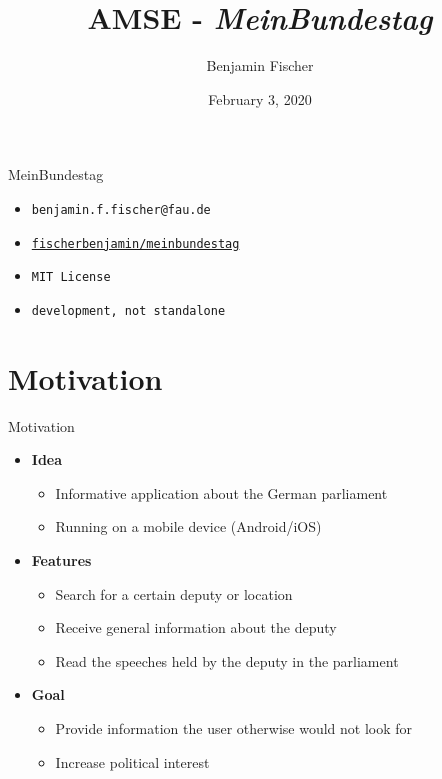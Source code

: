 \documentclass{beamer}
\title{AMSE - \textit{MeinBundestag}}
\date{February 3, 2020}
\author{Benjamin Fischer}
\institute{\faInstitution{}\quad{}Friedrich-Alexander Universität Erlangen-Nürnberg}
\begin{document}
  \maketitle

  \begin{frame}[plain]{MeinBundestag}
    \begin{itemize}
      \item[\faEnvelope]\quad
      \texttt{benjamin.f.fischer@fau.de}
      \item[\faGithub]\quad
      \href{https://github.com/fischerbenjamin/meinbundestag}{\texttt{fischerbenjamin/meinbundestag}}
      \item[\faCopyright]\quad
      \texttt{MIT License}
      \item[\faCogs]\quad
      \texttt{development, not standalone}
    \end{itemize} 
  \end{frame}

  \section{Motivation}
  \begin{frame}[plain]{Motivation}
    \begin{itemize}
      \item[\faInfoCircle]\quad
      \textbf{Idea}
      \begin{itemize}
        \item Informative application about the German parliament
        \item Running on a mobile device (Android/iOS)
      \end{itemize}
      \item[\faBars]\quad
      \textbf{Features}
      \begin{itemize}
        \item Search for a certain deputy or location
        \item Receive general information about the deputy
        \item Read the speeches held by the deputy in the parliament
      \end{itemize}
      \item[\faHeart]\quad
      \textbf{Goal}
      \begin{itemize}
        \item Provide information the user otherwise would not look for
        \item Increase political interest
      \end{itemize}
    \end{itemize}
  \end{frame}
\end{document}
